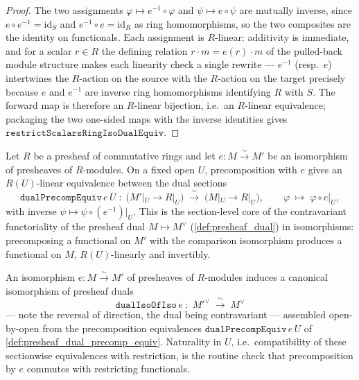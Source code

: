 \begin{proof}

\leanok
  The two assignments \(\varphi \mapsto e^{-1} \circ \varphi\) and
  \(\psi \mapsto e \circ \psi\) are mutually inverse, since \(e \circ e^{-1} =
  \mathrm{id}_S\) and \(e^{-1} \circ e = \mathrm{id}_R\) as ring homomorphisms, so the
  two composites are the identity on functionals. Each assignment is \(R\)-linear:
  additivity is immediate, and for a scalar \(r \in R\) the defining relation
  \(r \cdot m = e(r) \cdot m\) of the pulled-back module structure makes each linearity
  check a single rewrite --- \(e^{-1}\) (resp.\ \(e\)) intertwines the \(R\)-action on
  the source with the \(R\)-action on the target precisely because \(e\) and \(e^{-1}\)
  are inverse ring homomorphisms identifying \(R\) with \(S\). The forward map is
  therefore an \(R\)-linear bijection, i.e.\ an \(R\)-linear equivalence; packaging the
  two one-sided maps with the inverse identities gives
  \(\mathtt{restrictScalarsRingIsoDualEquiv}\).
\end{proof}

\begin{definition}

  \label{def:presheaf_dual_precomp_equiv}
  Let \(R\) be a presheaf of commutative rings and let \(e : M \xrightarrow{\sim} M'\)
  be an isomorphism of presheaves of \(R\)-modules. On a fixed open \(U\), precomposition
  with \(e\) gives an \(R(U)\)-linear equivalence between the dual sections
  \[
    \mathtt{dualPrecompEquiv}\,e\,U \;\colon\;
      \bigl(M'|_U \to R|_U\bigr) \;\xrightarrow{\ \sim\ }\; \bigl(M|_U \to R|_U\bigr),
      \qquad \varphi \;\longmapsto\; \varphi \circ e|_U,
  \]
  with inverse \(\psi \mapsto \psi \circ (e^{-1})|_U\). This is the section-level core of
  the contravariant functoriality of the presheaf dual \(M \mapsto M^\vee\)
  (\cref{def:presheaf_dual}) in isomorphisms: precomposing a functional on \(M'\) with
  the comparison isomorphism produces a functional on \(M\), \(R(U)\)-linearly and
  invertibly.
\end{definition}

\begin{definition}

  \label{def:presheaf_dual_iso_of_iso}
  An isomorphism \(e : M \xrightarrow{\sim} M'\) of presheaves of \(R\)-modules induces a
  canonical isomorphism of presheaf duals
  \[
    \mathtt{dualIsoOfIso}\,e \;\colon\; M'^\vee \;\xrightarrow{\ \sim\ }\; M^\vee
  \]
  --- note the reversal of direction, the dual being contravariant --- assembled
  open-by-open from the precomposition equivalences
  \(\mathtt{dualPrecompEquiv}\,e\,U\) of \cref{def:presheaf_dual_precomp_equiv}.
  Naturality in \(U\), i.e.\ compatibility of these sectionwise equivalences with
  restriction, is the routine check that precomposition by \(e\) commutes with
  restricting functionals.
\end{definition}

